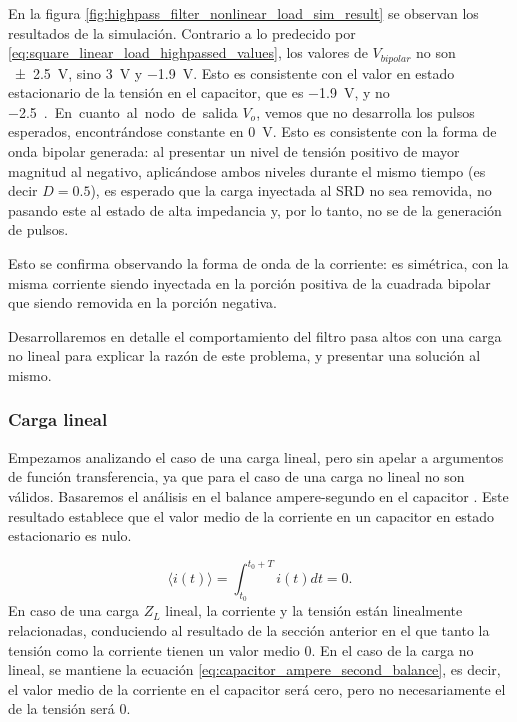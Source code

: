 En la figura \ref{fig:highpass_filter_nonlinear_load_sim_result} se observan los
resultados de la simulación. Contrario a lo predecido por
\ref{eq:square_linear_load_highpassed_values}, los valores de $V_{bipolar}$ no
son \qty{\pm2.5}{\volt}, sino \qty{3}{\volt} y \qty{-1.9}{\volt}. Esto es
consistente con el valor en estado estacionario de la tensión en el capacitor,
que es \qty{-1.9}{\volt}, y no \qty{-2.5}{\volt.}

En cuanto al nodo de salida $V_o$, vemos que no desarrolla los pulsos esperados,
encontrándose constante en \qty{0}{\volt}. Esto es consistente con la forma de
onda bipolar generada: al presentar un nivel de tensión positivo de mayor
magnitud al negativo, aplicándose ambos niveles durante el mismo tiempo (es
decir $D=0.5$), es esperado que la carga inyectada al SRD no sea removida, no
pasando este al estado de alta impedancia y, por lo tanto, no se de la
generación de pulsos.

Esto se confirma observando la forma de onda de la corriente: es simétrica, con
la misma corriente siendo inyectada en la porción positiva de la cuadrada
bipolar que siendo removida en la porción negativa.

Desarrollaremos en detalle el comportamiento del filtro pasa altos con una carga
no lineal para explicar la razón de este problema, y presentar una solución al
mismo.

\subsubsection{Carga lineal}

Empezamos analizando el caso de una carga lineal, pero sin apelar a argumentos
de función transferencia, ya que para el caso de una carga no lineal no son
válidos. Basaremos el análisis en el balance ampere-segundo en el capacitor
\cite{Erickson_Robert_W_2020}. Este resultado establece que el valor medio de la
corriente en un capacitor en estado estacionario es nulo.

\begin{equation}
    \label{eq:capacitor_ampere_second_balance}
    \langle i(t) \rangle = \int_{t_0}^{t_0+T} i(t)dt = 0.
\end{equation}
En caso de una carga $Z_L$ lineal, la corriente y la tensión están linealmente
relacionadas, conduciendo al resultado de la sección anterior en el que tanto la
tensión como la corriente tienen un valor medio 0. En el caso de la carga no
lineal, se mantiene la ecuación \ref{eq:capacitor_ampere_second_balance}, es
decir, el valor medio de la corriente en el capacitor será cero, pero no
necesariamente el de la tensión será 0.


